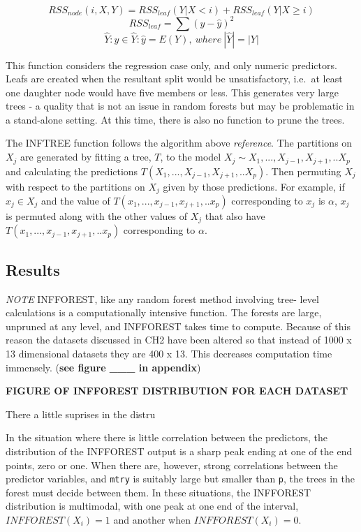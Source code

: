 \documentclass[12pt,twoside]{reedthesis}
\begin{document}
  \[RSS_{node} (i,X,Y) = RSS_{leaf}(Y|X <i) + RSS_{leaf}(Y|X \geq i) \]
  \[RSS_{leaf} = \sum (y - \hat{y})^2 \]
  \[\hat{Y}: \hat{y} \in \hat{Y}: \hat{y} = E(Y), \ where\  |\hat{Y}| = |Y|\]
  
  This function considers the regression case only, and only numeric
  predictors. Leafs are created when the resultant split would be
  unsatisfactory, i.e.~at least one daughter node would have five members
  or less. This generates very large trees - a quality that is not an
  issue in random forests but may be problematic in a stand-alone setting.
  At this time, there is also no function to prune the trees.
  
  The INFTREE function follows the algorithm above \emph{reference}. The
  partitions on \(X_j\) are generated by fitting a tree, \(T\), to the
  model \(X_j \sim X_1,..., X_{j-1}, X_{j+1},..X_p\) and calculating the
  predictions \(T(X_1,..., X_{j-1}, X_{j+1},..X_p)\). Then permuting
  \(X_j\) with respect to the partitions on \(X_j\) given by those
  predictions. For example, if \(x_j \in X_j\) and the value of
  \(T(x_1,..., x_{j-1}, x_{j+1},..x_p)\) corresponding to \(x_j\) is
  \(\alpha\), \(x_j\) is permuted along with the other values of \(X_j\)
  that also have \(T(x_1,..., x_{j-1}, x_{j+1},..x_p)\) corresponding to
  \(\alpha\).
  
  \subsection{Results}\label{results}
  
  \emph{NOTE} INFFOREST, like any random forest method involving tree-
  level calculations is a computationally intensive function. The forests
  are large, unpruned at any level, and INFFOREST takes time to compute.
  Because of this reason the datasets discussed in CH2 have been altered
  so that instead of 1000 x 13 dimensional datasets they are 400 x 13.
  This decreases computation time immensely. (\textbf{see figure \_\_\_ in
  appendix})
  
  \textbf{FIGURE OF INFFOREST DISTRIBUTION FOR EACH DATASET}
  
  There a little suprises in the distru
  
  In the situation where there is little correlation between the
  predictors, the distribution of the INFFOREST output is a sharp peak
  ending at one of the end points, zero or one. When there are, however,
  strong correlations between the predictor variables, and \texttt{mtry}
  is suitably large but smaller than \texttt{p}, the trees in the forest
  must decide between them. In these situations, the INFFOREST
  distribution is multimodal, with one peak at one end of the interval,
  \(INFFOREST(X_i) = 1\) and another when \(INFFOREST(X_i) = 0\).
  
\end{document}
